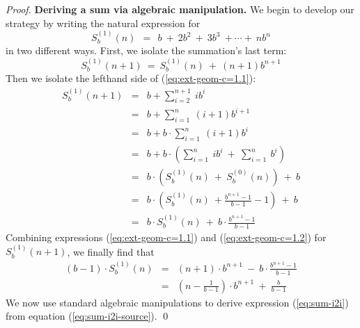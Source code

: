 \begin{proof}
{\bf Deriving a sum via algebraic manipulation.}
We begin to develop our strategy by writing the natural expression for
\[ S_b^{(1)}(n) \ \ = \ \ b \ + \ 2b^2 \ + \ 3 b^3 \ + \cdots + \ n b^n  \]
in two different ways.  First, we isolate the summation's last term:
\begin{equation}
\label{eq:ext-geom-c=1.1}
S_b^{(1)}(n+1) \ = \ S_b^{(1)}(n) \ + \ (n+1) b^{n+1}
\end{equation}
Then we isolate the lefthand side of (\ref{eq:ext-geom-c=1.1}):
\begin{eqnarray}
\nonumber
S_b^{(1)}(n+1)
     & = &
b + \sum_{i=2}^{n+1} \ i b^{i}  \\
\nonumber
& = &
b + \sum_{i=1}^n \ (i+1) b^{i+1}  \\
\nonumber
     & = &
b +  b \cdot \sum_{i=1}^n \ (i+1) b^i \\
\nonumber
     & = &
b + 
b \cdot \left(
\sum_{i=1}^n \ i b^i 
 \ + \
\sum_{i=1}^n \  b^i 
\right) \\
\nonumber
     & = &
b \cdot \left( S_b^{(1)}(n) \ + \ S_b^{(0)}(n) \right) \ + \ b \\
\nonumber
& = &
b \cdot \left( S_b^{(1)}(n) \ +  \frac{b^{n+1} -1}{b-1} -1 \right) \ + \ b \\
\label{eq:ext-geom-c=1.2}
    & = &
b \cdot S_b^{(1)}(n) \ + \ b \cdot \frac{b^{n+1} - 1}{b-1}
\end{eqnarray}
Combining expressions (\ref{eq:ext-geom-c=1.1}) and (\ref{eq:ext-geom-c=1.2}) for $S_b^{(1)}(n+1)$, we finally find that
\begin{eqnarray}
\nonumber
(b-1) \cdot S_b^{(1)}(n) & = &
(n+1) \cdot b^{n+1} \ - \ b \cdot \frac{b^{n+1} -1}{b-1} \\
\label{eq:sum-i2i-source}
 & = &
\left( n - \frac{1}{b-1} \right) \cdot b^{n+1} \ + \ \frac{b}{b-1}
\end{eqnarray}
We now use standard algebraic manipulations to derive expression (\ref{eq:sum-i2i}) from equation (\ref{eq:sum-i2i-source}).  \qed
\end{proof}

